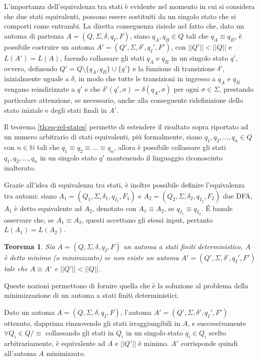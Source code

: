 \documentclass[a4paper,12pt]{report}
\newcommand{\partitioned}[2]{#1\slash\!\!#2}
\newtheorem{theorem}{Teorema}[chapter]
\begin{document}
L'importanza dell'equivalenza tra stati è evidente nel momento in cui si considera che
due stati equivalenti, possono essere sostituiti da un singolo stato che si comporti come entrambi.
La diretta conseguenza risiede nel fatto che, dato un automa di partenza $A = (Q, \Sigma, \delta, q_I, F)$, 
siano $q_A, q_B \in Q$ tali che $q_A \equiv q_B$, è possibile costruire un automa $A' = (Q', \Sigma, \delta', q_I', F')$,
con $||Q'|| < ||Q||$ e $L(A') = L(A)$, facendo collassare gli stati $q_A$ e $q_B$ in un singolo stato $q'$, ovvero, definendo
$Q' = Q \setminus \{q_A, q_B\} \cup \{q'\}$ e la funzione di transizione $\delta'$, inizialmente uguale a $\delta$,
in modo che tutte le transizioni in ingresso a $q_A$ e $q_B$ vengano reindirizzate a $q'$ e che
$\delta'(q', \sigma) = \delta(q_A, \sigma)$ per ogni $\sigma \in \Sigma$, prestando particolare attenzione,
se necessario, anche alla conseguente ridefinizione dello stato iniziale e degli stati finali in $A'$.

Il teorema \ref{th:eq-rel-states} permette di estendere il risultato sopra riportato ad un numero arbitrario di
stati equivalenti, più formalmente, siano $q_1, q_2, \dots, q_n \in Q$ con $n \in \mathbb{N}$ tali che
$q_1 \equiv q_2 \equiv \dots \equiv q_n$, allora è possibile collassare gli stati $q_1, q_2, \dots, q_n$ in un
singolo stato $q'$ mantenendo il linguaggio riconosciuto inalterato.

Grazie all'idea di equivalenza tra stati, è inoltre possibile definire l'equivalenza tra automi: siano
$A_1 = (Q_1, \Sigma, \delta_1, q_{I_1}, F_1)$ e $A_2 = (Q_2, \Sigma, \delta_2, q_{I_2}, F_2)$ due DFA, 
$A_1$ è detto equivalente ad $A_2$, denotato con $A_1 \equiv A_2$, se $q_{I_1} \equiv q_{I_2}$.
É banale osservare che, se $A_1 \equiv A_2$, questi accettano gli stessi input, pertanto $L(A_1) = L(A_2)$.

\begin{theorem}
  \label{th:min-dfa}
  Sia $A = (Q, \Sigma, \delta, q_I, F)$ un automa a stati finiti deterministico, $A$ è detto minimo (o minimizzato) se non esiste
  un automa $A' = (Q', \Sigma, \delta', q_I', F')$ tale che $A \equiv A'$ e $||Q'|| < ||Q||$.
\end{theorem}

Queste nozioni permettono di fornire quella che è la soluzione al problema della minimizzazione di un automa a
stati finiti deterministici.

Dato un automa $A = (Q, \Sigma, \delta, q_I, F)$, l'automa $A' = (Q', \Sigma, \delta', q_I', F')$ ottenuto, dapprima
rimuovendo gli stati irraggiungibili in $A$, e successivamente $\forall Q_i \in \partitioned{Q}{\equiv}$ collassando gli stati
in $Q_i$ in un singolo stato $q_i \in Q_i$ scelto arbitrariamente, è equivalente ad $A$ e $||Q'||$ è minimo.
$A'$ corrisponde quindi all'automa $A$ minimizzato.
\end{document}
